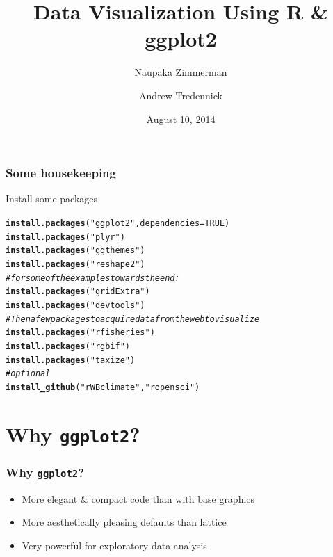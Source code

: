 \documentclass{beamer}\usepackage[]{graphicx}\usepackage[]{color}
\makeatletter
\newcommand{\hlnum}[1]{\textcolor[rgb]{0.686,0.059,0.569}{#1}}%
\newcommand{\hlstr}[1]{\textcolor[rgb]{0.192,0.494,0.8}{#1}}%
\newcommand{\hlcom}[1]{\textcolor[rgb]{0.678,0.584,0.686}{\textit{#1}}}%
\newcommand{\hlstd}[1]{\textcolor[rgb]{0.345,0.345,0.345}{#1}}%
\newcommand{\hlkwc}[1]{\textcolor[rgb]{0.333,0.667,0.333}{#1}}%
\newcommand{\hlkwd}[1]{\textcolor[rgb]{0.737,0.353,0.396}{\textbf{#1}}}%
\newenvironment{kframe}{%
 \def\at@end@of@kframe{}%
 \ifinner\ifhmode%
  \def\at@end@of@kframe{\end{minipage}}%
  \begin{minipage}{\columnwidth}%
 \fi\fi%
 \def\FrameCommand##1{\hskip\@totalleftmargin \hskip-\fboxsep
 \colorbox{shadecolor}{##1}\hskip-\fboxsep
     \hskip-\linewidth \hskip-\@totalleftmargin \hskip\columnwidth}%
 \MakeFramed {\advance\hsize-\width
   \@totalleftmargin\z@ \linewidth\hsize
   \@setminipage}}%
 {\par\unskip\endMakeFramed%
 \at@end@of@kframe}
\newenvironment{knitrout}{}{} %
\makeatother
\begin{document}

\title{Data Visualization Using R \& ggplot2}
\author{Naupaka Zimmerman \and Andrew Tredennick}
\date{August 10, 2014}
\maketitle


\begin{frame}[fragile]
\frametitle{Some housekeeping}
Install some packages
\begin{knitrout}\footnotesize
{}\color{fgcolor}\begin{kframe}
\begin{alltt}
\hlkwd{install.packages}\hlstd{(}\hlstr{"ggplot2"}\hlstd{,} \hlkwc{dependencies} \hlstd{=} \hlnum{TRUE}\hlstd{)}
\hlkwd{install.packages}\hlstd{(}\hlstr{"plyr"}\hlstd{)}
\hlkwd{install.packages}\hlstd{(}\hlstr{"ggthemes"}\hlstd{)}
\hlkwd{install.packages}\hlstd{(}\hlstr{"reshape2"}\hlstd{)}
\hlcom{# for some of the examples towards the end:}
\hlkwd{install.packages}\hlstd{(}\hlstr{"gridExtra"}\hlstd{)}
\hlkwd{install.packages}\hlstd{(}\hlstr{"devtools"}\hlstd{)}
\hlcom{# Then a few packages to acquire data from the web to visualize}
\hlkwd{install.packages}\hlstd{(}\hlstr{"rfisheries"}\hlstd{)}
\hlkwd{install.packages}\hlstd{(}\hlstr{"rgbif"}\hlstd{)}
\hlkwd{install.packages}\hlstd{(}\hlstr{"taxize"}\hlstd{)}
\hlcom{# optional}
\hlkwd{install_github}\hlstd{(}\hlstr{"rWBclimate"}\hlstd{,} \hlstr{"ropensci"}\hlstd{)}
\end{alltt}
\end{kframe}
\end{knitrout}
\end{frame}


\section*{Why \texttt{ggplot2}?}
\frame{\sectionpage}


\begin{frame}[fragile]
\frametitle{Why \texttt{ggplot2}?}
\begin{itemize}
\item More elegant \& compact code than with base graphics\\
\item More aesthetically pleasing defaults than lattice\\
\item Very powerful for exploratory data analysis\\
\end{itemize}
\end{frame}
\end{document}
